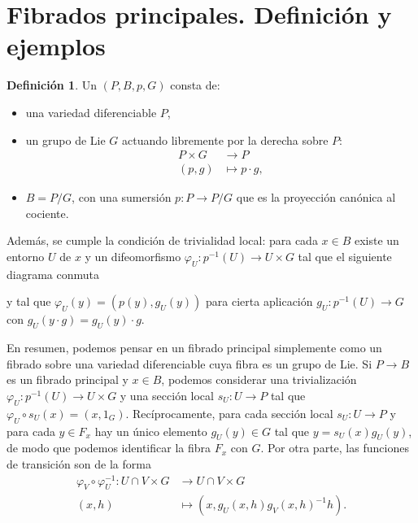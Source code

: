 \documentclass[12pt,a4paper]{article}
\theoremstyle{definition} \newtheorem{defn}[thm]{Definición}
\theoremstyle{definition} \newtheorem{ejemplo}[thm]{Ejemplo}
\theoremstyle{definition} \newtheorem{ejercicio}[thm]{Ejercicio}
\theoremstyle{remark} \newtheorem*{obs}{Observación}
\def\pr{\mathrm{pr}}
\let\emph\relax
\begin{document}
	    \section{Fibrados principales. Definición y ejemplos}
	    \begin{defn}
	      Un \emph{fibrado principal} $(P,B,p,G)$ consta de:
		  \begin{itemize}
		    \item una variedad diferenciable $P$,
		    \item un grupo de Lie $G$ actuando libremente por la derecha sobre $P$:
		      \begin{align*}
			 P\times G&\longrightarrow P\\ 
			  (p,g) &\longmapsto p\cdot g ,
			\end{align*}
		    \item $B=P/G$, con una sumersión $p:P\rightarrow P/G$ que es la proyección canónica al cociente.
		  \end{itemize}
		  Además, se cumple la condición de trivialidad local: para cada $x \in B$ existe un entorno $U$ de $x$ y un difeomorfismo $\varphi_U:p^{-1}(U) \rightarrow U \times G$ tal que el siguiente diagrama conmuta
      \begin{center}
      \end{center}
      y tal que $\varphi_U(y)=(p(y),g_U(y))$ para cierta aplicación $g_U:p^{-1}(U)\rightarrow G$ con $g_U(y\cdot g)=g_U(y)\cdot g$.
	    \end{defn}
      En resumen, podemos pensar en un fibrado principal simplemente como un fibrado sobre una variedad diferenciable cuya fibra es un grupo de Lie.
	    Si $P\rightarrow B$ es un fibrado principal y $x\in B$, podemos considerar una trivialización $\varphi_U:p^{-1}(U)\rightarrow U \times G$ y una sección local $s_U:U\rightarrow P$ tal que $\varphi_U\circ s_U(x)=(x,1_G)$. Recíprocamente, para cada sección local $s_U:U\rightarrow P$ y para cada $y \in F_x$ hay un único elemento $g_U(y)\in G$ tal que $y=s_U(x) g_U(y)$, de modo que podemos identificar la fibra $F_x$ con $G$. Por otra parte, las funciones de transición son de la forma
	    \begin{align*}
	      \varphi_V\circ \varphi_U^{-1} :U\cap V \times G&\longrightarrow U\cap V \times G\\ 
	      (x,h) &\longmapsto (x,g_U(x,h) g_V(x,h)^{-1}h). 
	      \end{align*}
\end{document}

